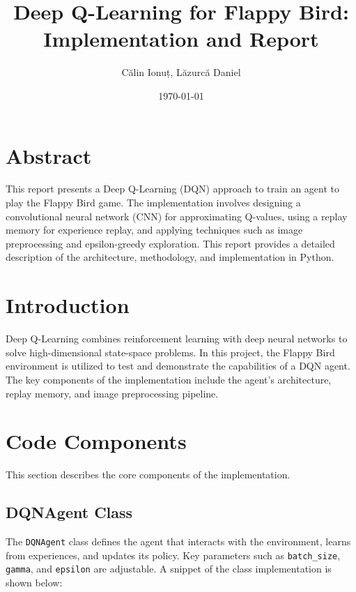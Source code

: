 \documentclass[a4paper,12pt]{article}
\title{Deep Q-Learning for Flappy Bird: Implementation and Report}
\author{Călin Ionuț, Lăzurcă Daniel}
\date{\today}
\begin{document}
\maketitle

\section*{Abstract}
This report presents a Deep Q-Learning (DQN) approach to train an agent to play the Flappy Bird game. The implementation involves designing a convolutional neural network (CNN) for approximating Q-values, using a replay memory for experience replay, and applying techniques such as image preprocessing and epsilon-greedy exploration. This report provides a detailed description of the architecture, methodology, and implementation in Python.

\section{Introduction}
Deep Q-Learning combines reinforcement learning with deep neural networks to solve high-dimensional state-space problems. In this project, the Flappy Bird environment is utilized to test and demonstrate the capabilities of a DQN agent. The key components of the implementation include the agent's architecture, replay memory, and image preprocessing pipeline.

\section{Code Components}
This section describes the core components of the implementation.

\subsection{DQNAgent Class}
The \texttt{DQNAgent} class defines the agent that interacts with the environment, learns from experiences, and updates its policy. Key parameters such as \texttt{batch\_size}, \texttt{gamma}, and \texttt{epsilon} are adjustable. A snippet of the class implementation is shown below:
\end{document}
